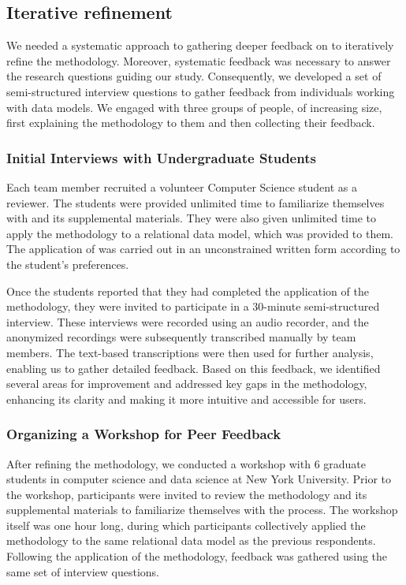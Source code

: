 \subsection{Iterative refinement}
\label{sec:credal:refine}

We needed a systematic approach to gathering deeper feedback on \credal to iteratively refine the methodology. Moreover, systematic feedback was necessary to answer the research questions guiding our study. Consequently, we developed a set of semi-structured interview questions to gather feedback from individuals working with data models.  We engaged with three groups of people, of increasing size, first explaining the \credal methodology to them and then collecting their feedback.

\subsubsection{Initial Interviews with Undergraduate Students}
\label{sec:credal:refine:1}

Each team member recruited a volunteer Computer Science student as a reviewer. The students were provided unlimited time to familiarize themselves with \credal and its supplemental materials. They were also given unlimited time to apply the methodology to a relational data model, which was provided to them. The application of \credal was carried out in an unconstrained written form according to the student's preferences.

Once the students reported that they had completed the application of the methodology, they were invited to participate in a 30-minute semi-structured interview. These interviews were recorded using an audio recorder, and the anonymized recordings were subsequently transcribed manually by team members. The text-based transcriptions were then used for further analysis, enabling us to gather detailed feedback. Based on this feedback, we identified several areas for improvement and addressed key gaps in the methodology, enhancing its clarity and making it more intuitive and accessible for users.

\subsubsection{Organizing a Workshop for Peer Feedback}
\label{sec:credal:refine:2}

After refining the methodology, we conducted a workshop with 6 graduate students in computer science and data science at New York University. Prior to the workshop, participants were invited to review the \credal methodology and its supplemental materials to familiarize themselves with the process. The workshop itself was one hour long, during which participants collectively applied the methodology to the same relational data model as the previous respondents. Following the application of the methodology, feedback was gathered using the same set of interview questions.

